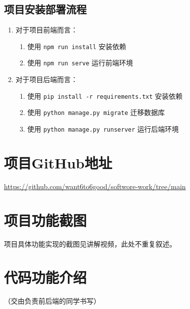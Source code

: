 \documentclass[UTF8,a4paper,10pt]{ctexart}
\begin{document}
\subsection{项目安装部署流程}

\begin{enumerate}
    \item 对于项目前端而言：
    \begin{enumerate}
        \item 使用 \texttt{npm run install} 安装依赖
        \item 使用 \texttt{npm run serve} 运行前端环境
    \end{enumerate}
    \item 对于项目后端而言：
    \begin{enumerate}
        \item 使用 \texttt{pip install -r requirements.txt} 安装依赖
        \item 使用 \texttt{python manage.py migrate} 迁移数据库
        \item 使用 \texttt{python manage.py runserver} 运行后端环境
    \end{enumerate}
\end{enumerate}


\section{项目GitHub地址}

\url{https://github.com/want6to6good/softwore-work/tree/main}

\section{项目功能截图}

项目具体功能实现的截图见讲解视频，此处不重复叙述。

\section{代码功能介绍}

（交由负责前后端的同学书写）
\end{document}
